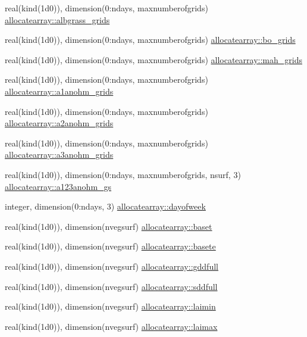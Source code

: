 \begin{DoxyCompactItemize}
\item 
real(kind(1d0)), dimension(0\+:ndays, maxnumberofgrids) \hyperlink{namespaceallocatearray_ab69cb9f5e7236e8417d44a2b47a543d5}{allocatearray\+::albgrass\+\_\+grids}
\item 
real(kind(1d0)), dimension(0\+:ndays, maxnumberofgrids) \hyperlink{namespaceallocatearray_ace47843655c90683e7e9d552fe6d16df}{allocatearray\+::bo\+\_\+grids}
\item 
real(kind(1d0)), dimension(0\+:ndays, maxnumberofgrids) \hyperlink{namespaceallocatearray_a3726b9b257444736e7319b5fe72dbb90}{allocatearray\+::mah\+\_\+grids}
\item 
real(kind(1d0)), dimension(0\+:ndays, maxnumberofgrids) \hyperlink{namespaceallocatearray_a7ee45a16de162e892800412aaf12860f}{allocatearray\+::a1anohm\+\_\+grids}
\item 
real(kind(1d0)), dimension(0\+:ndays, maxnumberofgrids) \hyperlink{namespaceallocatearray_acf7a96adc3b69c60d4ce6e7dfc650d84}{allocatearray\+::a2anohm\+\_\+grids}
\item 
real(kind(1d0)), dimension(0\+:ndays, maxnumberofgrids) \hyperlink{namespaceallocatearray_a2b748c97acf1e59645afb30c49a9ef9a}{allocatearray\+::a3anohm\+\_\+grids}
\item 
real(kind(1d0)), dimension(0\+:ndays, maxnumberofgrids, nsurf, 3) \hyperlink{namespaceallocatearray_a90def3338a21c4f1e7411ed20b48521f}{allocatearray\+::a123anohm\+\_\+gs}
\item 
integer, dimension(0\+:ndays, 3) \hyperlink{namespaceallocatearray_a7bc9ecd33459d391cf70ea0bb83dce0f}{allocatearray\+::dayofweek}
\item 
real(kind(1d0)), dimension(nvegsurf) \hyperlink{namespaceallocatearray_a49f3ef4737336da78b6aaacae1084644}{allocatearray\+::baset}
\item 
real(kind(1d0)), dimension(nvegsurf) \hyperlink{namespaceallocatearray_a25e6bb019be7fb8c46aa2c0b067ff289}{allocatearray\+::basete}
\item 
real(kind(1d0)), dimension(nvegsurf) \hyperlink{namespaceallocatearray_ae49dddcd41fe5e50e947da3ecdfeae49}{allocatearray\+::gddfull}
\item 
real(kind(1d0)), dimension(nvegsurf) \hyperlink{namespaceallocatearray_ab1f90daea4da5dc0660d0ce9aec88a4a}{allocatearray\+::sddfull}
\item 
real(kind(1d0)), dimension(nvegsurf) \hyperlink{namespaceallocatearray_ab3f65c4c4c46b200d0e63121b457d7c4}{allocatearray\+::laimin}
\item 
real(kind(1d0)), dimension(nvegsurf) \hyperlink{namespaceallocatearray_a535874e25b1042564b17301e8d84147b}{allocatearray\+::laimax}

\end{DoxyCompactItemize}
